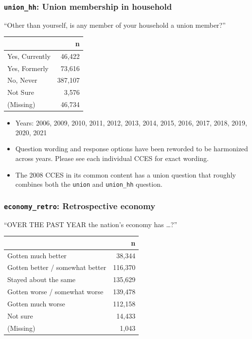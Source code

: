\documentclass[10pt,article,oneside]{memoir}
\theoremstyle{definition}
\begin{document}
\hypertarget{union_hh-union-membership-in-household}{%
\subsubsection{\texorpdfstring{\texttt{union\_hh}: Union membership in
household}{union\_hh: Union membership in household}}\label{union_hh-union-membership-in-household}}

``Other than yourself, is any member of your household a union member?''

\begin{table}[H]
\centering
\begin{tabular}[t]{lr}
\toprule
 & n\\
\midrule
Yes, Currently & 46,422\\
Yes, Formerly & 73,616\\
No, Never & 387,107\\
Not Sure & 3,576\\
(Missing) & 46,734\\
\bottomrule
\end{tabular}
\end{table}

\begin{itemize}
\tightlist
\item
  Years: 2006, 2009, 2010, 2011, 2012, 2013, 2014, 2015, 2016, 2017,
  2018, 2019, 2020, 2021
\item
  Question wording and response options have been reworded to be
  harmonized across years. Please see each individual CCES for exact
  wording.
\item
  The 2008 CCES in its common content has a union question that roughly
  combines both the \texttt{union} and \texttt{union\_hh} question.
\end{itemize}

\hypertarget{economy_retro-retrospective-economy}{%
\subsubsection{\texorpdfstring{\texttt{economy\_retro}: Retrospective
economy}{economy\_retro: Retrospective economy}}\label{economy_retro-retrospective-economy}}

``OVER THE PAST YEAR the nation's economy has \ldots?''

\begin{table}[H]
\centering
\begin{tabular}[t]{lr}
\toprule
 & n\\
\midrule
Gotten much better & 38,344\\
Gotten better / somewhat better & 116,370\\
Stayed about the same & 135,629\\
Gotten worse / somewhat worse & 139,478\\
Gotten much worse & 112,158\\
Not sure & 14,433\\
(Missing) & 1,043\\
\bottomrule
\end{tabular}
\end{table}
\end{document}
